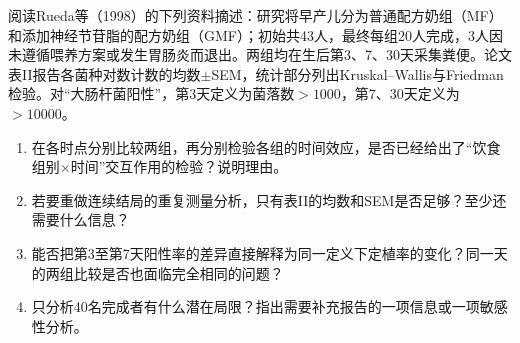 阅读Rueda等（1998）的下列资料摘述：研究将早产儿分为普通配方奶组（MF）和添加神经节苷脂的配方奶组（GMF）；初始共43人，最终每组20人完成，3人因未遵循喂养方案或发生胃肠炎而退出。两组均在生后第3、7、30天采集粪便。论文表II报告各菌种对数计数的均数$\pm$SEM，统计部分列出Kruskal--Wallis与Friedman检验。对“大肠杆菌阳性”，第3天定义为菌落数$>1000$，第7、30天定义为$>10000$。
\begin{enumerate}
\item 在各时点分别比较两组，再分别检验各组的时间效应，是否已经给出了“饮食组别$\times$时间”交互作用的检验？说明理由。
\item 若要重做连续结局的重复测量分析，只有表II的均数和SEM是否足够？至少还需要什么信息？
\item 能否把第3至第7天阳性率的差异直接解释为同一定义下定植率的变化？同一天的两组比较是否也面临完全相同的问题？
\item 只分析40名完成者有什么潜在局限？指出需要补充报告的一项信息或一项敏感性分析。
\end{enumerate}
